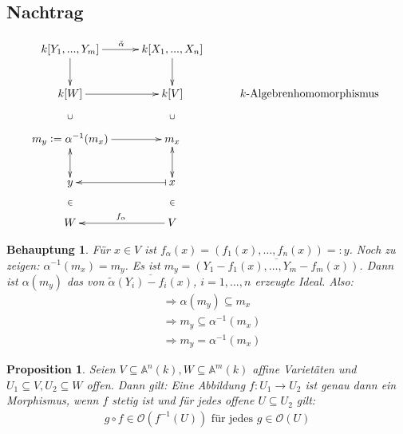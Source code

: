 \documentclass[a4paper,12pt]{report}
\theoremstyle{break}
\newtheorem{Prop}[Def]{Proposition}
\theoremstyle{nonumberbreak}
\newtheorem{Beh}{Behauptung}
\theoremstyle{nonumberplain}
\newcommand{\defeqr}[0]{\mathrel{\mathop:}=}
\newcommand{\defeql}[0]{=\mathrel{\mathop:}}
\begin{document}
\subsection*{Nachtrag}
\[
\begin{xy}
\xymatrix{
k[Y_1,...,Y_m]\ar[r]^{\tilde{\alpha}}\ar[d]&k[X_1,...,X_n]\ar[d] \\
k[W]\ar[r]\ar@{}[d]|{\cup}&k[V]\ar@{}[d]|{\cup}&\text{ $k$-Algebrenhomomorphismus } \\
m_y\defeqr\alpha^{-1}(m_x)\ar[r]\ar@{<->}[d]&m_x\ar@{<->}[d] \\
y\ar@{}[d]|{\in}& x\ar@{|->}[l]\ar@{}[d]|{\in}\\
W&V\ar[l]_{f_\alpha}
}
\end{xy}
\]
\begin{Beh}
Für $x \in V$ ist $f_\alpha(x)=(f_1(x),\dots,f_n(x))\defeql y$. Noch zu zeigen: $\alpha^{-1}(m_x)=m_y$. Es ist $m_y=\overline{(Y_1-f_1(x),\dots,Y_m-f_m(x))}$. Dann ist $\alpha(m_y)$ das von $\overline{\tilde{\alpha}(Y_i)-f_i(x)}$, $i=1,\dots,n$ erzeugte Ideal. Also:
\begin{align*}
&\Rightarrow \alpha(m_y)\subseteq m_x \\
&\Rightarrow m_y\subseteq\alpha^{-1}(m_x) \\
&\Rightarrow m_y=\alpha^{-1}(m_x)
\end{align*}
\end{Beh}
\begin{Prop}
\label{prop:6.6}
  Seien $V\subseteq\mathbb A^n(k), W\subseteq\mathbb A^m(k)$ affine Varietäten und $U_1\subseteq V, U_2\subseteq W$ offen. Dann gilt: Eine Abbildung $f:U_1\longrightarrow U_2$ ist genau dann ein Morphismus, wenn $f$ stetig ist und für jedes offene $U\subseteq U_2$ gilt:
  \begin{align*}
    g\circ f \in \mathcal O(f^{-1}(U)) \text{ für jedes } g\in\mathcal O(U)
  \end{align*}

\end{Prop}
\end{document}
